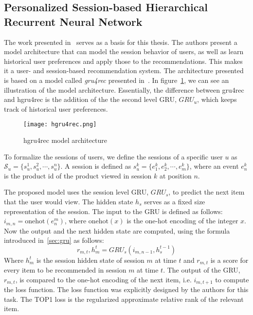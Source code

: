 \subsection{Personalized Session-based Hierarchical Recurrent Neural Network}\label{sec:hgru4rec}
The work presented in~\cite{hierarchical} serves as a basis for this thesis.
The authors present a model architecture that can model the session behavior of users, as well as learn historical user preferences and apply those to the recommendations.
This makes it a user- and session-based recommendation system.
The architecture presented is based on a model called \emph{gru4rec} presented in~\cite{gru4rec}.
In figure~\ref{fig:hgru4rec}, we can see an illustration of the model architecture.
Essentially, the difference between gru4rec and hgru4rec is the addition of the the second level GRU, $GRU_{u}$, which keeps track of historical user preferences.
\begin{figure}[ht]
	\centering
	\captionsetup{width=0.8\textwidth}
    \texttt{[image: hgru4rec.png]}
    \caption{hgru4rec model architecture}
    \label{fig:hgru4rec}
\end{figure}
To formalize the sessions of users, we define the sessions of a specific user $u$ as $\mathcal{S}_u = \lbrace s_u^1, s_u^2, \cdots, s_u^n \rbrace $.
A session is defined as $s_u^k = \lbrace e^k_1, e^k_2, \cdots, e^k_m \rbrace $, where an event $e^k_n$ is the product id of the product viewed in session $k$ at position $n$.
\par
The proposed model uses the session level GRU, $GRU_s$, to predict the next item that the user would view.
The hidden state $h_s$ serves as a fixed size representation of the session.
The input to the GRU is defined as follows: $i_{m,n} = \text{onehot} ( e^m_n )$, where $\text{onehot}(x)$ is the one-hot encoding of the integer $x$.
Now the output and the next hidden state are computed, using the formula introduced in~\ref{sec:gru} as follows:
\begin{equation}\label{eq:hgru4rec_session}
    r_{m,t}, h_m^{t} = GRU_s(i_{m,n-1}, h_s^{t-1})
\end{equation}
Where $h_m^{t}$ is the session hidden state of session $m$ at time $t$ and $r_{m,t}$ is a score for every item to be recommended in session $m$ at time $t$.
The output of the GRU, $r_{m,t}$, is compared to the one-hot encoding of the next item, i.e. $i_{m,t+1}$ to compute the loss function.
The loss function was explicitly designed by the authors for this task.
The TOP1 loss is the regularized approximate relative rank of the relevant item.
